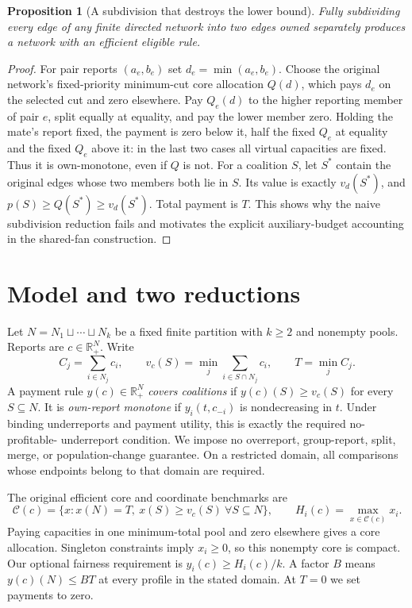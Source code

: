 \documentclass[11pt]{article}
\newtheorem{proposition}[theorem]{Proposition}
\theoremstyle{definition}\newtheorem{definition}[theorem]{Definition}
\theoremstyle{remark}\newtheorem{remark}[theorem]{Remark}
\newcommand{\R}{\mathbb R}
\newcommand{\core}{\mathcal C}
\begin{document}
\begin{proposition}[A subdivision that destroys the lower bound]\label{dag:subdivision}
Fully subdividing every edge of any finite directed network into two edges
owned separately produces a network with an efficient eligible rule.
\end{proposition}
\begin{proof}
For pair reports $(a_e,b_e)$ set $d_e=\min(a_e,b_e)$. Choose the original
network's fixed-priority minimum-cut core allocation $Q(d)$, which pays
$d_e$ on the selected cut and zero elsewhere. Pay $Q_e(d)$ to the higher
reporting member of pair $e$, split equally at equality, and pay the lower
member zero. Holding the mate's report fixed, the payment is zero below it,
half the fixed $Q_e$ at equality and the fixed $Q_e$ above it: in the last
two cases all virtual capacities are fixed. Thus it is own-monotone, even
if $Q$ is not. For a coalition $S$, let $S^*$ contain the original edges
whose two members both lie in $S$. Its value is exactly $v_d(S^*)$, and
$p(S)\ge Q(S^*)\ge v_d(S^*)$. Total payment is $T$. This shows why the naive subdivision reduction fails and motivates the
explicit auxiliary-budget accounting in the shared-fan construction.
\end{proof}

\section{Model and two reductions}\label{sec:model}
Let $N=N_1\sqcup\cdots\sqcup N_k$ be a fixed finite partition with
$k\ge2$ and nonempty pools. Reports are $c\in\R_+^N$. Write
\[
 C_j=\sum_{i\in N_j}c_i,\qquad
 v_c(S)=\min_j\sum_{i\in S\cap N_j}c_i,\qquad T=\min_j C_j.
\]
A payment rule $y(c)\in\R_+^N$ \emph{covers coalitions} if
$y(c)(S)\ge v_c(S)$ for every $S\subseteq N$. It is \emph{own-report
monotone} if $y_i(t,c_{-i})$ is nondecreasing in $t$. Under binding
underreports and payment utility, this is exactly the required no-profitable-
underreport condition. We impose no overreport, group-report, split, merge,
or population-change guarantee. On a restricted domain, all comparisons
whose endpoints belong to that domain are required.

The original efficient core and coordinate benchmarks are
\[
 \core(c)=\{x:x(N)=T,\ x(S)\ge v_c(S)\ \forall S\subseteq N\},
 \qquad H_i(c)=\max_{x\in\core(c)}x_i.
\]
Paying capacities in one minimum-total pool and zero elsewhere gives a core
allocation. Singleton constraints imply $x_i\ge0$, so this nonempty core is
compact. Our optional fairness requirement is $y_i(c)\ge H_i(c)/k$.
A factor $B$ means $y(c)(N)\le BT$ at every profile in the stated domain.
At $T=0$ we set payments to zero.
\end{document}
